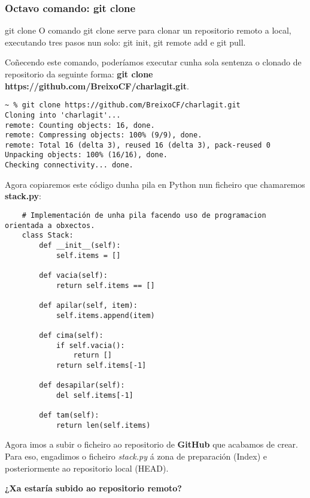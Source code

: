 \begin{frame}[fragile]
  \frametitle{Octavo comando: git clone}
  \begin{box}{git clone}
    O comando git clone serve para clonar un repositorio remoto a local, executando tres pasos nun solo: git init, git remote add e git pull.
  \end{box}
  Coñecendo este comando, poderíamos executar cunha sola sentenza o clonado de
  repositorio da seguinte forma: \textbf{git clone
    https://github.com/BreixoCF/charlagit.git}.
\begin{verbatim}
~ % git clone https://github.com/BreixoCF/charlagit.git
Cloning into 'charlagit'...
remote: Counting objects: 16, done.
remote: Compressing objects: 100% (9/9), done.
remote: Total 16 (delta 3), reused 16 (delta 3), pack-reused 0
Unpacking objects: 100% (16/16), done.
Checking connectivity... done.
\end{verbatim}
\begin{frame}

\begin{frame}[fragile]
  \scriptsize
  Agora copiaremos este código dunha pila en Python nun ficheiro que chamaremos \textbf{stack.py}:
  \tiny
\begin{verbatim}
	# Implementación de unha pila facendo uso de programacion orientada a obxectos.
	class Stack:
	    def __init__(self):
	        self.items = []
	
	    def vacia(self):
	        return self.items == []
	
	    def apilar(self, item):
	        self.items.append(item)
	
	    def cima(self):
	        if self.vacia():
	            return []
	        return self.items[-1]
	
	    def desapilar(self):
	        del self.items[-1]
	
	    def tam(self):
	        return len(self.items)
\end{verbatim}
\end{frame}

\begin{frame}
  \normalsize
  Agora imos a subir o ficheiro ao repositorio de \textbf{GitHub} que acabamos de crear. Para eso, engadimos o ficheiro \textit{stack.py} á zona de preparación (Index) e posteriormente ao repositorio local (HEAD).\\
  \vspace{2cm}
  \large
  \begin{center}
    \textbf{¿Xa estaría subido ao repositorio remoto?}
  \end{center}
\end{frame}


\end{frame}
\end{frame}
